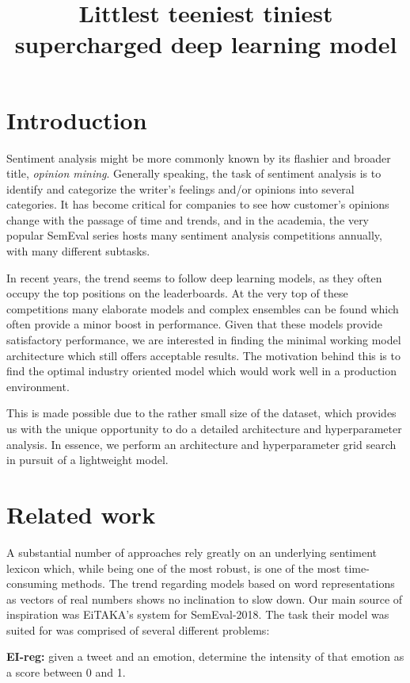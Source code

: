 \documentclass[10pt, a4paper]{article}
\title{Littlest teeniest tiniest supercharged deep learning model}
\begin{document}
\maketitleabstract

\section{Introduction}

Sentiment analysis might be more commonly known by its flashier and broader title, \textit{opinion mining}. 
Generally speaking, the task of sentiment analysis is to identify and categorize the writer's feelings and/or opinions into several categories. 
It has become critical for companies to see how customer's opinions change
with the passage of time and trends, and in the academia,
the very popular SemEval series hosts many sentiment analysis competitions annually,
with many different subtasks.

In recent years, the trend seems to follow deep learning models,
as they often occupy the top positions on the leaderboards.
At the very top of these competitions many elaborate models 
and complex ensembles can be found
which often provide a minor boost in performance.
Given that these models provide satisfactory performance,
we are interested in finding the minimal working model architecture
which still offers acceptable results.
The motivation behind this is to find the optimal industry oriented
model which would work well in a production environment.

This is made possible due to the rather small size of the dataset,
which provides us with the unique opportunity to do a detailed
architecture and hyperparameter analysis.
In essence, we perform an architecture and hyperparameter grid
search in pursuit of a lightweight model.

\section{Related work}
A substantial number of approaches rely greatly on an underlying sentiment lexicon \citep{lexicon_paper} which, while being one of the most robust, is one of the most time-consuming methods. The trend regarding models based on word representations as vectors of real numbers \citep{w2v} shows no inclination to slow down. Our main source of inspiration was EiTAKA's system \citep{mohammed-semeval} for SemEval-2018. The task their model was suited for was comprised of several different problems:

\textbf{EI-reg:} given a tweet and an emotion, determine the intensity of that emotion as a score between 0 and 1.
\end{document}
